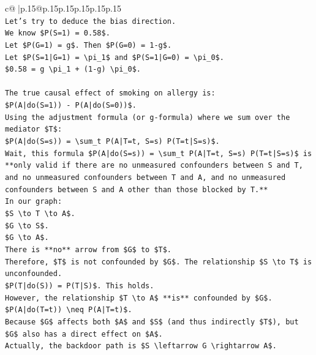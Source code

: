 \documentclass{article}
\begin{document}
{\begin{supertabular}{c@{$\;$}|p{.15\linewidth}@{}p{.15\linewidth}p{.15\linewidth}p{.15\linewidth}p{.15\linewidth}p{.15\linewidth}}
{{{\\ 
\texttt{Let's try to deduce the bias direction.} \\
\texttt{We know \$P(S=1) = 0.58\$.} \\
\texttt{Let \$P(G=1) = g\$. Then \$P(G=0) = 1{-}g\$.} \\
\texttt{Let \$P(S=1|G=1) = \textbackslash{}pi\_1\$ and \$P(S=1|G=0) = \textbackslash{}pi\_0\$.} \\
\texttt{\$0.58 = g \textbackslash{}pi\_1 + (1{-}g) \textbackslash{}pi\_0\$.} \\
\\ 
\texttt{The true causal effect of smoking on allergy is:} \\
\texttt{\$P(A|do(S=1)) {-} P(A|do(S=0))\$.} \\
\texttt{Using the adjustment formula (or g{-}formula) where we sum over the mediator \$T\$:} \\
\texttt{\$P(A|do(S=s)) = \textbackslash{}sum\_t P(A|T=t, S=s) P(T=t|S=s)\$.} \\
\texttt{Wait, this formula \$P(A|do(S=s)) = \textbackslash{}sum\_t P(A|T=t, S=s) P(T=t|S=s)\$ is **only valid if there are no unmeasured confounders between S and T, and no unmeasured confounders between T and A, and no unmeasured confounders between S and A other than those blocked by T.**} \\
\texttt{In our graph:} \\
\texttt{\$S \textbackslash{}to T \textbackslash{}to A\$.} \\
\texttt{\$G \textbackslash{}to S\$.} \\
\texttt{\$G \textbackslash{}to A\$.} \\
\texttt{There is **no** arrow from \$G\$ to \$T\$.} \\
\texttt{Therefore, \$T\$ is not confounded by \$G\$. The relationship \$S \textbackslash{}to T\$ is unconfounded.} \\
\texttt{\$P(T|do(S)) = P(T|S)\$. This holds.} \\
\texttt{However, the relationship \$T \textbackslash{}to A\$ **is** confounded by \$G\$.} \\
\texttt{\$P(A|do(T=t)) \textbackslash{}neq P(A|T=t)\$.} \\
\texttt{Because \$G\$ affects both \$A\$ and \$S\$ (and thus indirectly \$T\$), but \$G\$ also has a direct effect on \$A\$.} \\
\texttt{Actually, the backdoor path is \$S \textbackslash{}leftarrow G \textbackslash{}rightarrow A\$.} \\
}}}
\end{supertabular}}
\end{document}
